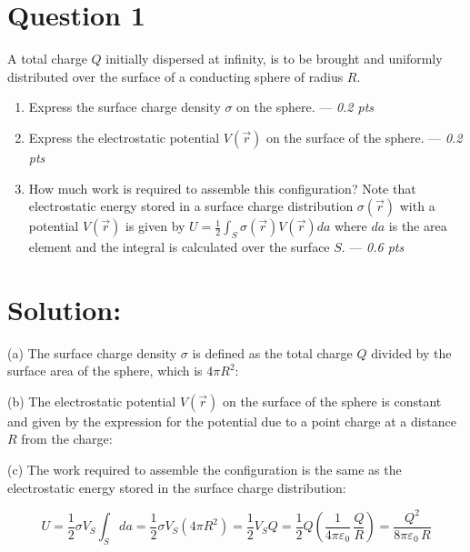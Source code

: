 \section*{Question 1}
A total charge $Q$ initially dispersed at infinity, is to be brought and uniformly distributed over the surface of a conducting sphere of radius $R$. 
\begin{enumerate}
    \item[(a)] Express the surface charge density $\sigma$ on the sphere. --- \textit{0.2 pts}
    \item[(b)] Express the electrostatic potential $V(\vec{r})$ on the surface of the sphere. --- \textit{0.2 pts}
    \item[(c)] How much work is required to assemble this configuration? Note that electrostatic energy stored in a surface charge distribution $\sigma(\vec{r})$ with a potential $V(\vec{r})$ is given by $U=\frac{1}{2} \int_{S} \sigma(\vec{r}) V(\vec{r}) da$ where $da$ is the area element and the integral is calculated over the surface $S$. --- \textit{0.6 pts}
\end{enumerate}

\section*{Solution:}

\begin{solution}
(a) The surface charge density $\sigma$ is defined as the total charge $Q$ divided by the surface area of the sphere, which is $4\pi R^2$:
\begin{center}
\end{center}

\noindent
(b) The electrostatic potential $V(\vec{r})$ on the surface of the sphere is constant and given by the expression for the potential due to a point charge at a distance $R$ from the charge:
\begin{center}
\end{center}
\noindent
(c) The work required to assemble the configuration is the same as the electrostatic energy stored in the surface charge distribution:

$$\displaystyle U
=\frac{1}{2}\sigma V_{S} \int_S da
=\frac{1}{2}\sigma V_{S} (4\pi R^2) = \frac{1}{2}V_S Q = \frac{1}{2} Q \left(\frac{1}{4\pi\varepsilon_0}\,\frac{Q}{R}\right) = \frac{Q^2}{8\pi\varepsilon_0\,R}$$

\begin{center}
\end{center}

\end{solution}




